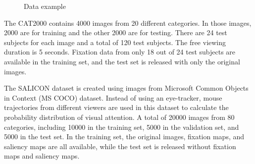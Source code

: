 \documentclass[12pt]{article}
\begin{document}
\begin{figure}[h!]
    \centering
    \hspace{1mm}
    \hspace{1mm}
    \caption{Data example}
    \label{img:data_example_2}
\end{figure}

The CAT2000 contains 4000 images from 20 different categories. In those images, 2000 are for training and the other 2000
are for testing. There are 24 test subjects for each image and a total of 120 test subjects. The free viewing duration is 5 seconds. Fixation data from only 18 out of 24 test subjects are available in the training
set, and the test set is released with only the original images.

The SALICON dataset is created using images from Microsoft Common Objects in Context (MS COCO) dataset\cite{linMicrosoftCOCOCommon2015}.
Instead of using an eye-tracker, mouse trajectories from different viewers are used in this dataset to calculate the probability distribution of visual attention. A total of 20000 images from 80 categories, including
10000 in the training set, 5000 in the validation set, and 5000 in the test set.
In the training set, the original images, fixation maps, and saliency maps are all available, while
the test set is released without fixation maps and saliency maps.
\end{document}
